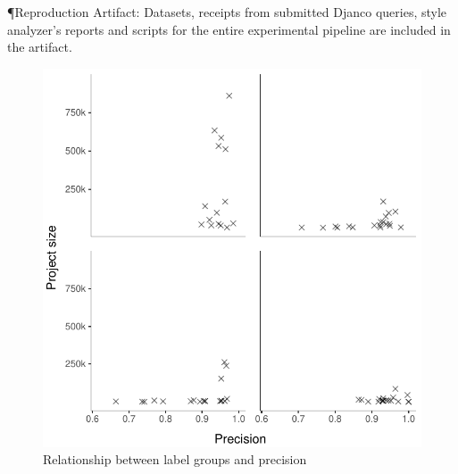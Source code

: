 \documentclass[sigconf,review,anonymous]{acmart}
\newcommand{\djco}{\textsf{Djanco}\xspace}
\begin{document}
\P{Reproduction Artifact:} Datasets, receipts from submitted \djco queries,
style analyzer's reports and scripts for the entire experimental pipeline are
included in the artifact.

%
%
%


\begin{figure}[th]
  \includegraphics[width=.8\columnwidth]{../figs/style-analyzer/precision-vs-samples.pdf}
  \caption{Relationship between label groups and precision}\label{fig:precision-vs-samples}
\end{figure}
\end{document}
